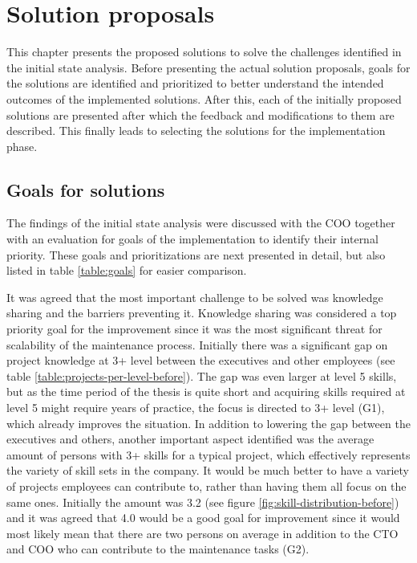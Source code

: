 \chapter{Solution proposals}
\label{chapter:proposal}

This chapter presents the proposed solutions to solve the challenges identified in the initial state analysis. Before presenting the actual solution proposals, goals for the solutions are identified and
prioritized to better understand the intended outcomes of the implemented solutions. After this, each of the initially proposed solutions are presented after which the feedback and modifications
to them are described. This finally leads to selecting the solutions for the implementation phase.

\section{Goals for solutions}
\label{section:goals}

The findings of the initial state analysis were discussed with the COO together with an evaluation for goals of the implementation to identify their internal priority.
These goals and prioritizations are next presented in detail, but also listed in table \ref{table:goals} for easier comparison.

It was agreed that the most important challenge to be solved was knowledge sharing and the barriers preventing it. Knowledge sharing was considered a top priority goal for the improvement
since it was the most significant threat for scalability of the maintenance process. Initially there was a significant gap on project knowledge
at 3+ level between the executives and other employees (see table \ref{table:projects-per-level-before}). The gap was even larger at level 5 skills, but as the time period of the thesis is 
quite short and acquiring skills required at level 5 might require years of practice, the focus is directed to 3+ level (G1), which already improves the situation. In addition to lowering
the gap between the executives and others, another important aspect identified was the average amount of persons with 3+ skills for a typical project, which effectively represents the 
variety of skill sets in the company. It would be much better to have a variety of projects employees can contribute to, rather than having them all focus on the same ones. Initially the amount
was 3.2 (see figure \ref{fig:skill-distribution-before}) and it was agreed that 4.0 would be a good goal for improvement since
it would most likely mean that there are two persons on average in addition to the CTO and COO who can contribute to the maintenance tasks (G2).

